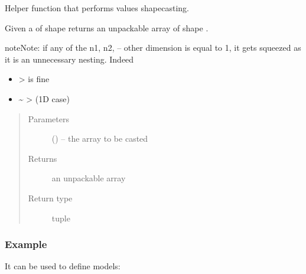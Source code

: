 \documentclass[letterpaper,10pt,english,openany,oneside]{sphinxmanual}
\begin{document}
\begin{fulllineitems}
\label{\detokenize{autogen:model.unpack_variables}}
Helper function that performs values shapecasting.

Given a  of shape 
returns an unpackable array of shape .

\begin{sphinxadmonition}{note}{Note:}
if any of the n1, n2, – other dimension is equal to 1,
it gets squeezed as it is an unnecessary nesting.
Indeed
\begin{itemize}
\item {} 
 \sphinxhyphen{}>  is fine

\item {} 
 \textasciitilde{}  \sphinxhyphen{}>  (1D case)

\end{itemize}
\end{sphinxadmonition}
\begin{quote}\begin{description}
\item[{Parameters}] \leavevmode
{} () – the array to be casted

\item[{Returns}] \leavevmode
an unpackable array

\item[{Return type}] \leavevmode
tuple

\end{description}\end{quote}
\subsubsection*{Example}

It can be used to define models:

\begin{sphinxVerbatim}[commandchars=\\\{\}]
 
      
     
\end{sphinxVerbatim}


\end{fulllineitems}
\end{document}
